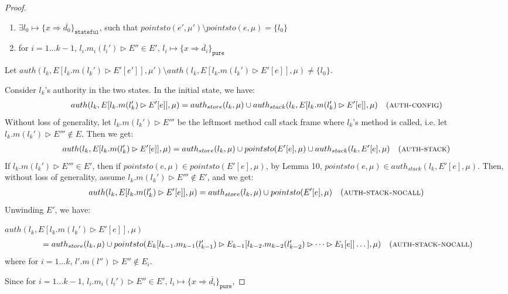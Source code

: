 \documentclass{llncs}
\newcommand{\keywadj}[1]{\mathtt{#1}}
\newcommand{\keyw}[1]{\keywadj{#1}~}
\begin{document}
\begin{proof}
\begin{enumerate}
\item $\exists l_0 \mapsto \{ x \Rightarrow \overline{d_0} \}_{\keywadj{stateful}}$, such that $pointsto(e', \mu') \setminus pointsto(e, \mu) = \{ l_0 \}$
\item for $i = 1 \dots k - 1$, $ l_i.m_i(l_i') \rhd E'' \in E'$, $l_i \mapsto \{ x \Rightarrow \overline{d_i} \}_{\keyw{pure}}$
\end{enumerate}

Let $auth(l_k, E[l_k.m(l_k') \rhd E'[e']], \mu') \setminus auth(l_k, E[l_k.m(l_k') \rhd E'[e]], \mu) \not= \{ l_0 \}$.

Consider $l_k$'s authority in the two states. In the initial state, we have:
\begin{align*}
auth(l_k, E[l_k.m(l_k') \rhd E'[e]], \mu) &= auth_{store}(l_k, \mu) \cup auth_{stack}(l_k, E[l_k.m(l_k') \rhd E'[e]], \mu) & (\textsc{auth-config})
\end{align*}
Without loss of generality, let $l_k.m(l_k') \rhd E'''$ be the leftmost method call stack frame where $l_k$'s method is called, i.e. let $l_k.m(l_k') \rhd E''' \not\in E$. Then we get:
\begin{align*}
auth(l_k, E[l_k.m(l_k') \rhd E'[e]], \mu) &= auth_{store}(l_k, \mu) \cup pointsto(E'[e], \mu) \cup auth_{stack}(l_k, E'[e], \mu) & (\textsc{auth-stack})
\end{align*}
If $l_k.m(l_k') \rhd E''' \in E'$, then if $pointsto(e, \mu) \in pointsto(E'[e], \mu)$, by Lemma 10, $pointsto(e, \mu) \in auth_{stack}(l_k, E'[e], \mu)$. Then, without loss of generality, assume $l_k.m(l_k') \rhd E''' \not\in E'$, and we get:
\begin{align*}
auth(l_k, E[l_k.m(l_k') \rhd E'[e]], \mu) &= auth_{store}(l_k, \mu) \cup pointsto(E'[e], \mu) & (\textsc{auth-stack-nocall})
\end{align*}
Unwinding $E'$, we have:

\noindent$auth(l_k, E[l_k.m(l_k') \rhd E'[e]], \mu)$
\vspace{-7pt}
\begin{align*}
&= auth_{store}(l_k, \mu) \cup pointsto(E_k[l_{k-1}.m_{k-1}(l_{k-1}') \rhd E_{k-1}[l_{k-2}.m_{k-2}(l_{k-2}') \rhd \dots \rhd E_1[e]] \dots ], \mu) & (\textsc{auth-stack-nocall})
\end{align*}
where for $i = 1 \dots k$, $l'.m(l'') \rhd E'' \not\in E_i$.

Since for $i = 1 \dots k - 1$, $ l_i.m_i(l_i') \rhd E'' \in E'$, $l_i \mapsto \{ x \Rightarrow \overline{d_i} \}_{\keywadj{pure}}$,


\end{proof}
\end{document}

